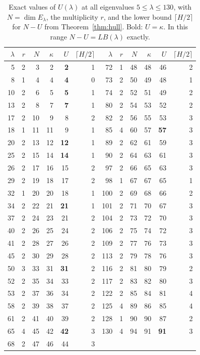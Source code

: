 \begin{table}[t]
\centering\small
\begin{tabular}{rrrrrr@{\qquad}rrrrrr}
\toprule
$\lambda$&$r$&$N$&$\kappa$&$U$&$\lceil H/2\rceil$&$\lambda$&$r$&$N$&$\kappa$&$U$&$\lceil H/2\rceil$\\
\midrule
5&2&3&2&\textbf{2}&1&72&1&48&48&46&2\\
8&1&4&4&\textbf{4}&0&73&2&50&49&48&1\\
10&2&6&5&\textbf{5}&1&74&2&52&51&49&2\\
13&2&8&7&\textbf{7}&1&80&2&54&53&52&2\\
17&2&10&9&8&2&82&2&56&55&53&3\\
18&1&11&11&9&1&85&4&60&57&\textbf{57}&3\\
20&2&13&12&\textbf{12}&1&89&2&62&61&59&3\\
25&2&15&14&\textbf{14}&1&90&2&64&63&61&3\\
26&2&17&16&15&2&97&2&66&65&63&3\\
29&2&19&18&17&2&98&1&67&67&65&1\\
32&1&20&20&18&1&100&2&69&68&66&2\\
34&2&22&21&\textbf{21}&1&101&2&71&70&67&3\\
37&2&24&23&21&2&104&2&73&72&70&3\\
40&2&26&25&24&2&106&2&75&74&72&3\\
41&2&28&27&26&2&109&2&77&76&73&3\\
45&2&30&29&28&2&113&2&79&78&76&3\\
50&3&33&31&\textbf{31}&2&116&2&81&80&79&2\\
52&2&35&34&33&2&117&2&83&82&80&3\\
53&2&37&36&34&2&122&2&85&84&81&4\\
58&2&39&38&37&2&125&4&89&86&85&4\\
61&2&41&40&39&2&128&1&90&90&87&2\\
65&4&45&42&\textbf{42}&3&130&4&94&91&\textbf{91}&3\\
68&2&47&46&44&3&&&&&&\\
\bottomrule
\end{tabular}
\medskip
\caption{Exact values of $U(\lambda)$ at all eigenvalues $5\le\lambda\le130$, with $N=\dim E_\lambda$, the multiplicity $r$, and the lower bound $\lceil H/2\rceil$ for $N-U$ from Theorem~\ref{thm:hull}. Bold: $U=\kappa$. In this range $N-U=LB(\lambda)$ exactly.}
\label{tab:U}
\end{table}
